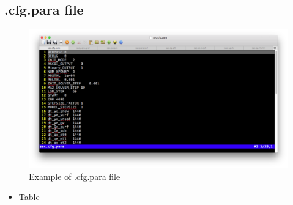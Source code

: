 \documentclass[]{scrbook}
\providecommand{\tightlist}{%
  \setlength{\itemsep}{0pt}\setlength{\parskip}{0pt}}
\begin{document}
\subsection{.cfg.para file}\label{cfg.para-file}

\begin{figure}
\centering
\includegraphics{Fig/IO/cfg.para.png}
\caption{Example of .cfg.para file}
\end{figure}

\begin{itemize}
\tightlist
\item
  Table
\end{itemize}
\end{document}
